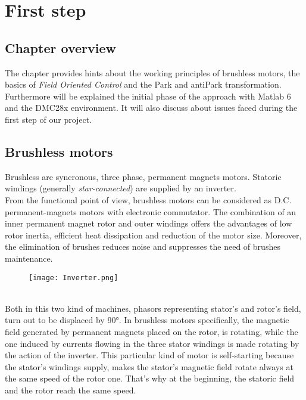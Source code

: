 \documentclass[12pt]{article}
\begin{document}
\section{First step}
\subsection{Chapter overview}
The chapter provides hints about the working principles of brushless motors, the basics of \textit{Field Oriented Control} and the Park and antiPark transformation.
Furthermore will be explained the initial phase of the approach with Matlab 6 and the DMC28x environment.
It will also discuss about issues faced during the first step of our project.
\subsection{Brushless motors}
Brushless are syncronous, three phase, permanent magnets motors.
Statoric windings (generally \textit{star-connected}) are supplied by an inverter.\\
From the functional point of view, brushless motors can be considered as D.C. permanent-magnets motors with electronic commutator.
The combination of an inner permanent magnet rotor and outer windings offers the advantages of low rotor inertia, efficient heat dissipation and reduction of the motor size. Moreover, the elimination of brushes reduces noise and suppresses the need of brushes maintenance.
\begin{figure}[h]
\centering
\texttt{[image: Inverter.png]}
\caption{\label{fig:ciao}}
\end{figure}\\
Both in this two kind of machines, phasors representing stator's and rotor's field, turn out to be displaced by 90°.
In brushless motors specifically, the magnetic field generated by permanent magnets placed on the rotor, is rotating, while the one induced by currents flowing in the three stator windings is made rotating by the action of the inverter.  
This particular kind of motor is self-starting because the stator's windings supply, makes the stator's magnetic field rotate always at the same speed of the rotor one.
That's why at the beginning, the statoric field and the rotor reach the same speed.
\end{document}
